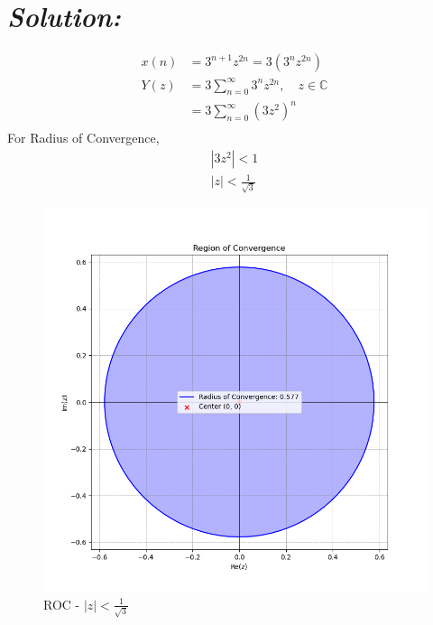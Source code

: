 \documentclass[journal,12pt,twocolumn]{IEEEtran}
\theoremstyle{remark}
\begin{document}
\section*{\textit{\textbf{Solution:}}}

\begin{align}
x(n) &= 3^{n+1}z^{2n}=3(3^{n}z^{2n})\\
Y(z) &= 3\sum_{n=0}^{\infty} 3^{n}z^{2n}, \quad z \in \mathbb{C}\\
&=3\sum_{n=0}^{\infty} {(3z^{2})}^{n}\\
\end{align}
 For Radius of Convergence,
 \begin{align}
|3z^2| < 1\\
|z| < \frac{1}{\sqrt{3}}
 \end{align}
 \begin{figure}[h]
\renewcommand\thefigure{1}
    \centering
    \includegraphics[width=0.8\columnwidth]{figs/fig1.png}
    \caption{ROC - $|z|< \frac{1}{\sqrt{3}}$}
    \label{Fig1_GATE MA 28}
\end{figure}
\end{document}
